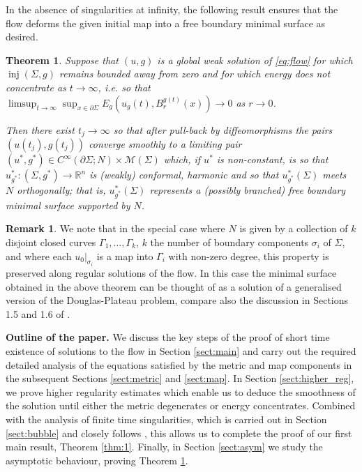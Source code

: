 \documentclass[10pt,reqno]{amsart}
\theoremstyle{plain}
\newtheorem{thm}[lemma]{Theorem}
\theoremstyle{definition}
\newtheorem{rmk}[lemma]{Remark}
\numberwithin{equation}{section}
\newcommand{\si}{\sigma}
\newcommand{\Si}{\Sigma}
\newcommand{\R}{\ensuremath{{\mathbb R}}}
\DeclareMathOperator{\inj}{inj}
\newcommand{\pSi}{{\partial \Sigma}}
\newcommand{\MM}{\mathcal{M}} %
\begin{document}
In the absence of singularities at infinity, the following result ensures that the flow deforms the given initial map into a free boundary minimal surface as desired.

\begin{thm}\label{thm:2}
    Suppose that $(u,g)$ is a global weak solution of \eqref{eq:flow} for which $\inj(\Si,g)$ remains bounded away from zero and for which energy does not concentrate as $t\to \infty $, i.e. so that $\limsup_{t\to \infty} \sup_{x\in \pSi} E_g(u_g(t),B_{r}^{g(t)}(x))\to 0$ as $r\to 0$. 
    
    Then there exist $t_j\to \infty$ so that after pull-back by diffeomorphisms the pairs $(u(t_j),g(t_j))$ converge smoothly to a limiting pair $(u^*,g^*)\in C^\infty(\pSi;N)\times \MM(\Si)$ which, if $u^*$ is non-constant, is so that $u^*_{g^*}:(\Si,g^*)\to \R^n$ is (weakly) conformal, harmonic and so that $u^*_{g^*}(\Si)$ meets $N$ orthogonally; that is, $u^*_{g^*}(\Si)$ represents a (possibly branched) free boundary minimal surface supported by $N$.
\end{thm}


\begin{rmk}\label{rmk:Plateau_Problem}
    We note that in the special case where $N$ is given by a collection of $k$ disjoint closed curves $\Gamma_1,\ldots,\Gamma_k$, $k$ the number of boundary components $\si_i$ of $\Si$, and where each $u_0\vert_{\si_i}$ is a map into $\Gamma_i$ with non-zero degree, this property is preserved along regular solutions of the flow. In this case the minimal surface obtained in the above theorem can be thought of as a solution of a generalised version of the Douglas-Plateau problem, 
    compare also the discussion in Sections 1.5 and 1.6 of \cite{S}.
\end{rmk}


\textbf{Outline of the paper.}  We discuss the key steps of the proof of short time existence of solutions to the flow  in Section \ref{sect:main} and carry out the required detailed analysis of the equations satisfied by the metric and map  components in the subsequent Sections \ref{sect:metric} and \ref{sect:map}. In Section \ref{sect:higher_reg}, we prove higher regularity estimates which enable us to deduce the smoothness of the solution until either the metric degenerates or energy concentrates. Combined with the analysis of finite time singularities, which is carried out in Section \ref{sect:bubble} and closely follows \cite{S}, this allows us to complete the proof of our first main result, Theorem \ref{thm:1}. Finally, in Section \ref{sect:asym} we study the asymptotic behaviour, proving Theorem \ref{thm:2}.
\end{document}
